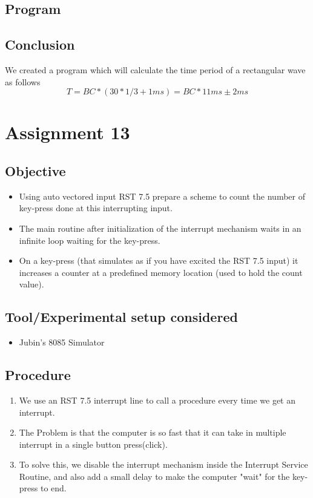 \documentclass[a4paper]{article} %
\begin{document}
    \subsection{Program}
        
    \subsection{Conclusion}
        We created a program which will calculate the time period of a rectangular wave as follows
        \[T= BC*(30*1/3 + 1ms) = BC*11ms \pm 2 ms\]
\newpage

\section[Interrupt Service Routine]{Assignment 13} %
    \subsection{Objective}
        \begin{itemize}
            \item Using auto vectored input RST 7.5 prepare a scheme to count the number of key-press done at this interrupting input.
            \item The main routine after initialization of the interrupt mechanism waits in an infinite loop waiting for the key-press. 
            \item On a key-press (that simulates as if you have excited the RST 7.5 input) it increases a counter at a predefined memory location (used to hold the count value).
        \end{itemize}
    \subsection{Tool/Experimental setup considered}
        \begin{itemize}
            \item Jubin's 8085 Simulator
        \end{itemize}
    \subsection{Procedure}
        \begin{enumerate}
            \item We use an RST 7.5 interrupt line to call a procedure every time we get an interrupt.
            \item The Problem is that the computer is so fast that it can take in multiple interrupt in a single button press(click).
            \item To solve this, we disable the interrupt mechanism inside the Interrupt Service Routine, and also add a small delay to make the computer "wait" for the key-press to end.
        \end{enumerate}
\end{document}
